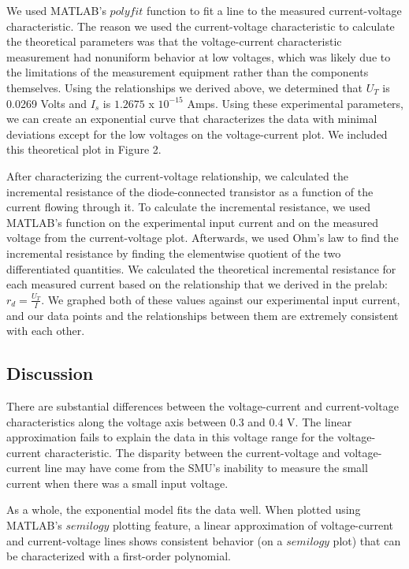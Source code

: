 \documentclass{article}
\begin{document}
We used MATLAB's $polyfit$ function to fit a line to the measured current-voltage characteristic. The reason we used the current-voltage characteristic to calculate the theoretical parameters was that the voltage-current characteristic measurement had nonuniform behavior at low voltages, which was likely due to the limitations of the measurement equipment rather than the components themselves. Using the relationships we derived above, we determined that $U_T$ is 0.0269 Volts and $I_s$ is $1.2675$ x $10^{-15}$ Amps. Using these experimental parameters, we can create an exponential curve that characterizes the data with minimal deviations except for the low voltages on the voltage-current plot.  We included this theoretical plot in Figure 2.

After characterizing the current-voltage relationship, we calculated the incremental resistance of the diode-connected transistor as a function of the current flowing through it. To calculate the incremental resistance, we used MATLAB's  function on the  experimental input current and on the measured voltage from the current-voltage plot. Afterwards, we used Ohm's law to find the incremental resistance by finding the elementwise quotient of the two differentiated quantities. 
We calculated the theoretical incremental resistance for each measured current based on the relationship that we derived in the prelab:
$r_d = \frac{U_T}{I}$.
We graphed both of these values against our experimental input current, and our data points and the relationships between them are extremely consistent with each other. 

\subsection{Discussion}
There are substantial differences between the voltage-current and current-voltage characteristics along the voltage axis between 0.3 and 0.4 V.  The linear approximation fails to explain the data in this voltage range for the voltage-current characteristic.  The disparity between the current-voltage and voltage-current line may have come from the SMU's inability to measure the small current when there was a small input voltage.

As a whole, the exponential model fits the data well.  When plotted using MATLAB's $semilogy$ plotting feature, a linear approximation of voltage-current and current-voltage lines shows consistent behavior (on a $semilogy$ plot) that can be characterized with a first-order polynomial.
\end{document}
